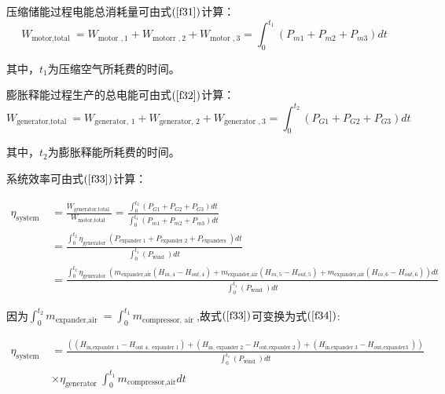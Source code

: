 \documentclass{jnuthesis}
\begin{document}
	\par 压缩储能过程电能总消耗量可由式$ (\fontsize{10.5bp}{10pt}\ref{f31}) $计算：
	\begin{equation}\label{f31}
		W_{\text {motor,total }}=W_{\text {motor }, 1}+W_{\text {motorr }, 2}+W_{\text {motor }, 3}=\int_{0}^{t_{1}}\left(P_{m 1}+P_{m 2}+P_{m 3}\right) d t
	\end{equation}
	
	
	\par 其中，$ t_1 $为压缩空气所耗费的时间。
	\par 膨胀释能过程生产的总电能可由式$ (\fontsize{10.5bp}{10pt}\ref{f32}) $计算：
	\begin{equation}\label{f32}
		W_{\text {generator,total }}=W_{\text {generator, } 1}+W_{\text {generator, } 2}+W_{\text {generator }, 3}=\int_{0}^{t_{2}}\left(P_{G 1}+P_{G 2}+P_{G 3}\right) d t
	\end{equation}
	
	其中，$ t_2 $为膨胀释能所耗费的时间。
	\par 系统效率可由式$ (\fontsize{10.5bp}{10pt}\ref{f33}) $计算：
	
	
	\begin{equation}\label{f33}
		\begin{aligned}
			\eta_{\text {system }}&=\frac{W_{\text {generator,total }}}{W_{\text {motor,total }}}=\frac{\int_{0}^{t_{2}}\left(P_{G 1}+P_{G 2}+P_{G 3}\right) d t}{\int_{0}^{t_{1}}\left(P_{m 1}+P_{m 2}+P_{m 3}\right) d t}
			\\
			&=\frac{\int_{0}^{t_{2}} \eta_{\text {generator }}\left(P_{\text {expander } 1}+P_{\text {expander } 2}+P_{\text {expanders }}\right) d t}{\int_{0}^{t_{1}}\left(P_{\text {wind }}\right) d t}\\
			&=\frac{\int_{0}^{t_{2}} \eta_{\text {generator }}\left(m_{\text {expander,air} }(H_{in,4}-H_{out,4})+m_{\text {expander,air} }(H_{in,5}-H_{out,5})+m_{\text {expander,air} }(H_{in,6}-H_{out,6})\right) d t}{\int_{0}^{t_{1}}\left(P_{\text {wind }}\right) d t}
		\end{aligned}
	\end{equation}
	
	
	因为$\int_{0}^{t_{2}} m_{\text {expander,air }}=\int_{0}^{t_{1}} m_{\text {compressor, air }}  $,故式$ (\fontsize{10.5bp}{10pt}\ref{f33}) $可变换为式$ (\fontsize{10.5bp}{10pt}\ref{f34}) $:
	
	\begin{equation}\label{f34}
		\begin{aligned}
			\eta_{\text {system }}&=\frac{\left(\left(H_{\text {in,expander } 1}-H_{\text {out } 4, \text { expander } 1}\right)+\left(H_{\text {in, expander } 2}-H_{\text {out,expander } 2}\right)+\left(H_{\text {in,expander } 3}-H_{\text {out,expander3 }}\right)\right) }{\int_{0}^{t_{1}}\left(P_{\text {wind }}\right) d t}\\ 
			&\times \eta_{\text {generator }} \int_{0}^{t_{1}} m_{\text {compressor,air}} d t
		\end{aligned}
	\end{equation}
	
\end{document}
